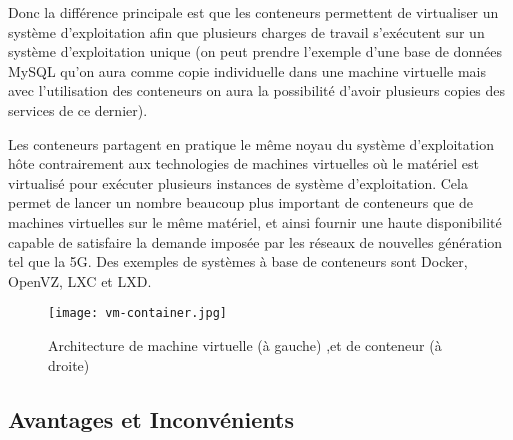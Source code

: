 Donc la différence principale est que les conteneurs permettent de virtualiser un système d'exploitation afin que plusieurs charges de travail s'exécutent sur un système d'exploitation unique (on peut prendre l'exemple d'une base de données MySQL qu'on aura comme copie individuelle dans une machine virtuelle mais avec l'utilisation des conteneurs on aura la possibilité d'avoir plusieurs copies des services de ce dernier).\par
Les conteneurs partagent en pratique le même noyau du système d'exploitation hôte contrairement aux technologies de machines virtuelles où le matériel est virtualisé pour exécuter plusieurs instances de système d'exploitation. Cela permet de lancer un nombre beaucoup plus important de conteneurs que de machines virtuelles sur le même matériel, et ainsi fournir une haute disponibilité capable de satisfaire la demande imposée par les réseaux de nouvelles génération tel que la 5G. Des exemples de systèmes à base de conteneurs sont Docker, OpenVZ, LXC et LXD. 
\begin{figure}[H]
\centering
\texttt{[image: vm-container.jpg]}
\caption{Architecture de machine virtuelle (à gauche) ,et de conteneur (à droite) \cite{alibabacloud}}
\label{fig:vmvsconteneur}
\end{figure}
\subsection{Avantages et Inconvénients}

